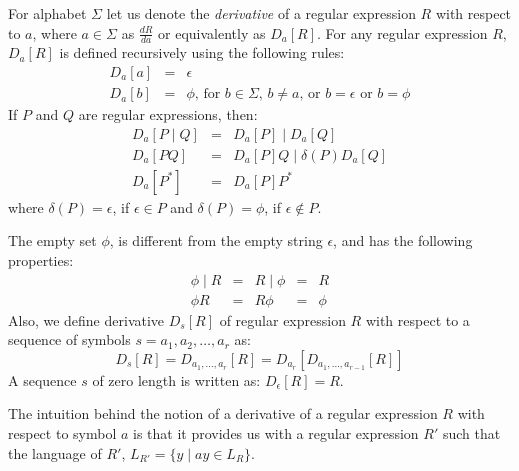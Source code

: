\documentclass[12pt]{article}
\begin{document}
\begin{exe}
\begin{xlist}
{}
\end{xlist}

\newpage

   \ex\label{derivative} 
   For alphabet $\Sigma$ let us denote the {\em derivative} of a regular expression
   $R$ with respect to $a$, where $a \in \Sigma$ as $\frac{dR}{da}$ or equivalently as
   $D_a[R]$. For any regular expression $R$, $D_a[R]$ is defined recursively using the following rules:
   	\begin{eqnarray}
		D_a[a] & = & \epsilon \label{e1} \\
		D_a[b] & = & \phi \textrm{,\ for $b \in \Sigma$, $b \neq a$, or $b = \epsilon$ or $b = \phi$}
			\label{e2}
	\end{eqnarray}
    If $P$ and $Q$ are regular expressions, then:
   \begin{eqnarray}
   D_a[P \mid Q] & = & D_a[P] \mid D_a[Q] \label{e3} \\
   D_a[P Q] & = & D_a[P] Q \mid \delta(P) D_a[Q] \label{e4} \\
   D_a[P^\ast] & = & D_a[P] P^\ast \label{e5}
   \end{eqnarray}
   where $\delta(P) = \epsilon$, if $\epsilon \in P$ and $\delta(P) = \phi$, if $\epsilon \not\in P$.

   The empty set $\phi$, is different from the empty string $\epsilon$, and has the following properties:
   \[ \begin{array}{lllll}
   \phi \mid R & = & R \mid \phi & = & R \\
   \phi R & = & R \phi & = & \phi
   \end{array} \]
   Also, we define derivative $D_s[R]$ of regular expression $R$ with respect to a sequence of symbols $s = a_1, a_2, \ldots, a_r$ as:
   \[ D_s[R] = D_{a_1, \ldots, a_r}[R] = D_{a_r}[ D_{a_1, \ldots, a_{r-1}}[R] ] \]
    A sequence $s$ of zero length is written as: $D_\epsilon[R] = R$.
    
   The intuition behind the notion of a derivative of a regular expression 
   $R$ with respect to symbol $a$ is that it provides
   us with a regular expression $R'$ such that the language of $R'$, 
   $L_{R'} = \{ y \mid ay \in L_R \}$.
   

\end{exe}
\end{document}
